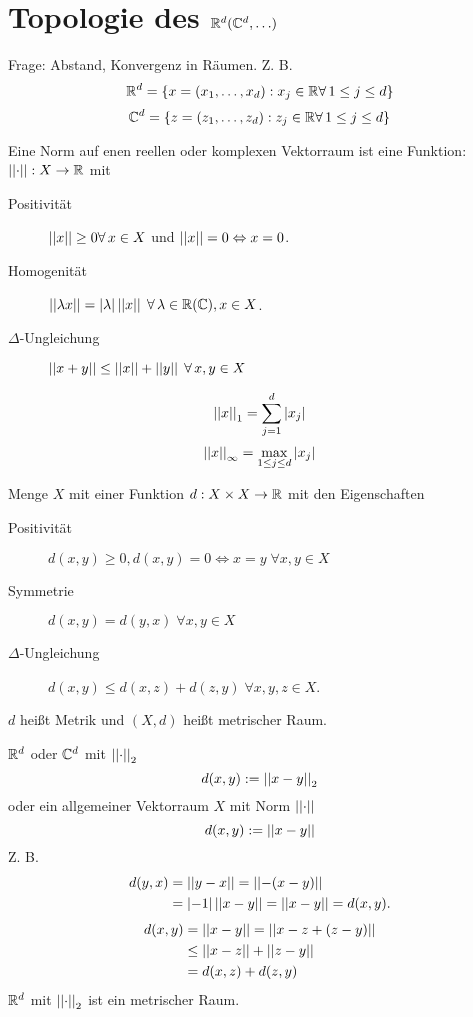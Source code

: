 \documentclass[../ana2.tex]{subfiles}
\begin{document}
\setcounter{section}{8}
\section{Topologie des \( \mathbb{R}^d (\mathbb{C}^d, \ldots) \)}
Frage: Abstand, Konvergenz in  
Räumen.
Z. B. 
\[ \R^d = \set{x = (x_1, \ldots, x_d) : 
x_j \in \R \forall 1 \leq j \leq d} \]
\[ \C^d = \set{z = (z_1, \ldots, z_d) : 
z_j \in \R \forall 1 \leq j \leq d} \]
\begin{defi}
    Eine Norm auf enen reellen oder komplexen Vektorraum
    ist eine Funktion: \( \left|\left|\cdot\right|\right|:X\rightarrow \mathbb{R} \) mit
    \begin{description}
        \item[Positivität] \( \norm{x} \geq 0 \forall x\in X \) 
        und \( \left|\left|x\right|\right| = 0 \Leftrightarrow x = 0 \).
        \item[Homogenität] \( \norm{\lambda x} = \abs{\lambda} \norm{x}
        \; \forall \lambda \in \R (\C), x\in X \).
        \item[\( \Delta \)-Ungleichung] \( \norm{x+y}
        \leq \norm{x} + \norm{y} \; \forall x,y \in X \)
    \end{description}
\end{defi}
\begin{bspe}
    \[ \left|\left|x\right|\right|_1 = \sum_{j=1}^d \left|x_j\right| \]
    \[ \left|\left|x\right|\right|_\infty 
    = \underset{1 \leq j \leq d}{\max} \left|x_j\right| \]
\end{bspe}
\begin{defi}
    Menge \(X\) mit einer Funktion \( d:X\times X\rightarrow \mathbb{R} \)
    mit den Eigenschaften
    \begin{description}
        \item[Positivität] \( d(x,y) \geq 0, d(x,y) = 0 \Leftrightarrow x=y
        \; \forall x,y \in X \)       
        \item[Symmetrie] \( d(x,y) = d(y,x) \; \forall x,y \in X \)
        \item[\( \Delta \)-Ungleichung] 
        \( d(x,y) \leq d(x,z) + d(z, y) 
        \; \forall x,y,z \in X \).
    \end{description}
    \(d\) heißt Metrik und \( (X, d) \) heißt metrischer 
    Raum.
\end{defi}
\begin{bsp}
    \( \mathbb{R}^d \) oder \( \mathbb{C}^d\) mit \(\left|\left|\cdot\right|\right|_2\)
    \[ d(x,y) := \left|\left|x-y\right|\right|_2 \]
    oder ein allgemeiner Vektorraum \(X\) mit Norm 
    \(\left|\left|\cdot\right|\right|\)
    \[ d(x,y) := \left|\left|x-y\right|\right| \]
    Z. B. 
    \begin{align*}
        d(y,x) &= \left|\left|y - x\right|\right| = \left|\left|-(x-y)\right|\right| \\
        &= \left|-1\right|\left|\left|x-y\right|\right| = \left|\left|x-y\right|\right| = d(x, y).
    \end{align*}
    \begin{align*}
        d(x,y) &= \left|\left|x-y\right|\right| = \left|\left|x-z + (z-y)\right|\right| \\
        &\leq \left|\left|x-z\right|\right| + \left|\left|z-y\right|\right| \\
        &= d(x,z) + d(z,y)
    \end{align*}
    \( \mathbb{R}^d \) mit \( \left|\left|\cdot\right|\right|_2 \) ist ein metrischer 
    Raum.
\end{bsp}
\end{document}
